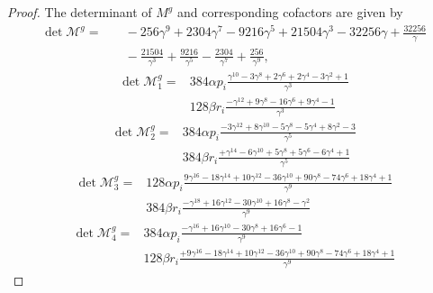 \documentclass[11pt,letterpaper]{amsart}
\newcommand{\mM}{\mathcal{M}}
\theoremstyle{definition}
\theoremstyle{remark}
\numberwithin{equation}{section}
\begin{document}
\begin{proof}
The determinant of $M^g$ and corresponding cofactors are given by
\begin{equation}\label{determinant-of-M-e}
\begin{split}
\det \mM^g=&\quad -256\gamma^9 + 2304\gamma^7 - 9216\gamma^5 + 21504\gamma^3 - 32256\gamma + \frac{32256}{\gamma} \\
&\quad - \frac{21504}{\gamma^3} + \frac{9216}{\gamma^5} - \frac{2304}{\gamma^7} + \frac{256}{\gamma^9},
\end{split}
\end{equation}
\begin{equation}
\begin{split}
\det \mM^g_1=& 384\alpha p_i \frac{ \gamma^{10} - 3\gamma^8 + 2\gamma^6 + 2\gamma^4 - 3\gamma^2 + 1}{\gamma^3} \\
      &128\beta r_i \frac{- \gamma^{12}  + 9\gamma^8- 16\gamma^6  + 9\gamma^4 - 1
  }{\gamma^3} 
\end{split}
\end{equation}
\begin{equation}
\begin{split}
\det \mM^g_2=& 384\alpha p_i \frac{
      -3\gamma^{12} + 8\gamma^{10} - 5\gamma^8 - 5\gamma^4 + 8\gamma^2 - 3}{\gamma^5} \\
      &384 \beta r_i\frac{ + \gamma^{14} - 6\gamma^{10}+ 5\gamma^8 + 5\gamma^6 - 6\gamma^4  +1  }{\gamma^5} 
\end{split}
\end{equation}
\begin{equation}
\begin{split}
\det \mM^g_3=& 128\alpha p_i \frac{
    9\gamma^{16} - 18\gamma^{14} + 10\gamma^{12} - 36\gamma^{10} + 90\gamma^8  - 74\gamma^6 + 18\gamma^4 + 1}{\gamma^9} \\
      &384 \beta r_i\frac{- \gamma^{18}  + 16\gamma^{12}  - 30\gamma^{10} + 16\gamma^8 - \gamma^2   }{\gamma^9} 
\end{split}
\end{equation}
\begin{equation}
\begin{split}
\det \mM^g_4=& 384\alpha p_i\frac{
      -\gamma^{16} + 16\gamma^{10} - 30\gamma^8 + 16\gamma^6 - 1}{\gamma^9} \\
      &128\beta r_i \frac{+ 9\gamma^{16}  - 18\gamma^{14} + 10\gamma^{12} - 36\gamma^{10} + 90\gamma^8  - 74\gamma^6  + 18\gamma^4  + 1  }{\gamma^9} 
\end{split}
\end{equation}


\end{proof}
\end{document}
